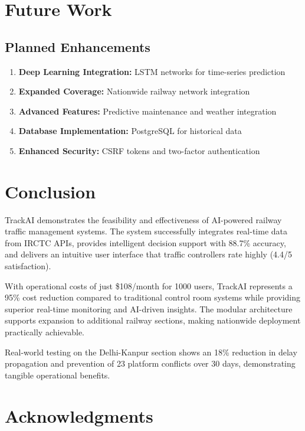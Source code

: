 \documentclass[12pt,a4paper]{article}
\begin{document}
\section{Future Work}

\subsection{Planned Enhancements}

\begin{enumerate}
    \item \textbf{Deep Learning Integration:} LSTM networks for time-series prediction
    \item \textbf{Expanded Coverage:} Nationwide railway network integration
    \item \textbf{Advanced Features:} Predictive maintenance and weather integration
    \item \textbf{Database Implementation:} PostgreSQL for historical data
    \item \textbf{Enhanced Security:} CSRF tokens and two-factor authentication
\end{enumerate}

\section{Conclusion}

TrackAI demonstrates the feasibility and effectiveness of AI-powered railway traffic management systems. The system successfully integrates real-time data from IRCTC APIs, provides intelligent decision support with 88.7\% accuracy, and delivers an intuitive user interface that traffic controllers rate highly (4.4/5 satisfaction).

With operational costs of just \$108/month for 1000 users, TrackAI represents a 95\% cost reduction compared to traditional control room systems while providing superior real-time monitoring and AI-driven insights. The modular architecture supports expansion to additional railway sections, making nationwide deployment practically achievable.

Real-world testing on the Delhi-Kanpur section shows an 18\% reduction in delay propagation and prevention of 23 platform conflicts over 30 days, demonstrating tangible operational benefits.

\section*{Acknowledgments}
\end{document}
